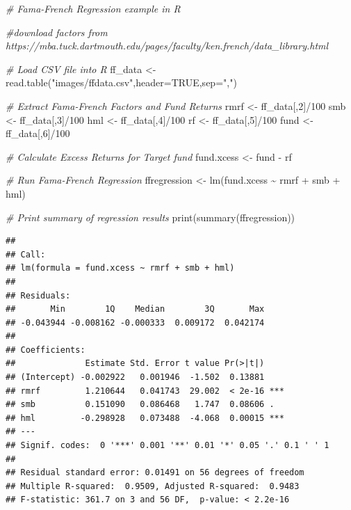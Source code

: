 \documentclass[
]{book}
\newenvironment{Shaded}{\begin{snugshade}}{\end{snugshade}}
\newcommand{\AttributeTok}[1]{\textcolor[rgb]{0.77,0.63,0.00}{#1}}
\newcommand{\CommentTok}[1]{\textcolor[rgb]{0.56,0.35,0.01}{\textit{#1}}}
\newcommand{\ConstantTok}[1]{\textcolor[rgb]{0.00,0.00,0.00}{#1}}
\newcommand{\DecValTok}[1]{\textcolor[rgb]{0.00,0.00,0.81}{#1}}
\newcommand{\FunctionTok}[1]{\textcolor[rgb]{0.00,0.00,0.00}{#1}}
\newcommand{\NormalTok}[1]{#1}
\newcommand{\OtherTok}[1]{\textcolor[rgb]{0.56,0.35,0.01}{#1}}
\newcommand{\SpecialCharTok}[1]{\textcolor[rgb]{0.00,0.00,0.00}{#1}}
\newcommand{\StringTok}[1]{\textcolor[rgb]{0.31,0.60,0.02}{#1}}
\begin{document}
\begin{Shaded}
\begin{Highlighting}[]
\CommentTok{\# Fama{-}French Regression example in R}

\CommentTok{\#download factors from https://mba.tuck.dartmouth.edu/pages/faculty/ken.french/data\_library.html}

\CommentTok{\# Load CSV file into R }
\NormalTok{ff\_data }\OtherTok{\textless{}{-}} \FunctionTok{read.table}\NormalTok{(}\StringTok{"images/ffdata.csv"}\NormalTok{,}\AttributeTok{header=}\ConstantTok{TRUE}\NormalTok{,}\AttributeTok{sep=}\StringTok{","}\NormalTok{)}
 
\CommentTok{\# Extract Fama{-}French Factors and Fund Returns}
\NormalTok{rmrf }\OtherTok{\textless{}{-}}\NormalTok{ ff\_data[,}\DecValTok{2}\NormalTok{]}\SpecialCharTok{/}\DecValTok{100}
\NormalTok{smb }\OtherTok{\textless{}{-}}\NormalTok{ ff\_data[,}\DecValTok{3}\NormalTok{]}\SpecialCharTok{/}\DecValTok{100}
\NormalTok{hml }\OtherTok{\textless{}{-}}\NormalTok{ ff\_data[,}\DecValTok{4}\NormalTok{]}\SpecialCharTok{/}\DecValTok{100}
\NormalTok{rf }\OtherTok{\textless{}{-}}\NormalTok{ ff\_data[,}\DecValTok{5}\NormalTok{]}\SpecialCharTok{/}\DecValTok{100}
\NormalTok{fund }\OtherTok{\textless{}{-}}\NormalTok{ ff\_data[,}\DecValTok{6}\NormalTok{]}\SpecialCharTok{/}\DecValTok{100}
 
\CommentTok{\# Calculate Excess Returns for Target fund}
\NormalTok{fund.xcess }\OtherTok{\textless{}{-}}\NormalTok{ fund }\SpecialCharTok{{-}}\NormalTok{ rf}
 
\CommentTok{\# Run Fama{-}French Regression}
\NormalTok{ffregression }\OtherTok{\textless{}{-}} \FunctionTok{lm}\NormalTok{(fund.xcess }\SpecialCharTok{\textasciitilde{}}\NormalTok{ rmrf }\SpecialCharTok{+}\NormalTok{ smb }\SpecialCharTok{+}\NormalTok{ hml)}
 
\CommentTok{\# Print summary of regression results}
\FunctionTok{print}\NormalTok{(}\FunctionTok{summary}\NormalTok{(ffregression))}
\end{Highlighting}
\end{Shaded}

\begin{verbatim}
## 
## Call:
## lm(formula = fund.xcess ~ rmrf + smb + hml)
## 
## Residuals:
##       Min        1Q    Median        3Q       Max 
## -0.043944 -0.008162 -0.000333  0.009172  0.042174 
## 
## Coefficients:
##              Estimate Std. Error t value Pr(>|t|)    
## (Intercept) -0.002922   0.001946  -1.502  0.13881    
## rmrf         1.210644   0.041743  29.002  < 2e-16 ***
## smb          0.151090   0.086468   1.747  0.08606 .  
## hml         -0.298928   0.073488  -4.068  0.00015 ***
## ---
## Signif. codes:  0 '***' 0.001 '**' 0.01 '*' 0.05 '.' 0.1 ' ' 1
## 
## Residual standard error: 0.01491 on 56 degrees of freedom
## Multiple R-squared:  0.9509, Adjusted R-squared:  0.9483 
## F-statistic: 361.7 on 3 and 56 DF,  p-value: < 2.2e-16
\end{verbatim}
\end{document}
